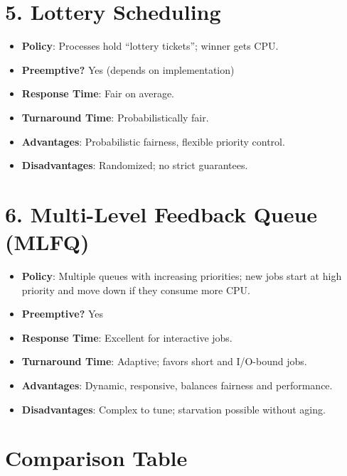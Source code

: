 \documentclass[12pt]{article}
\begin{document}
\section*{5. Lottery Scheduling}

\begin{itemize}
    \item \textbf{Policy}: Processes hold ``lottery tickets''; winner gets CPU.
    \item \textbf{Preemptive?} Yes (depends on implementation)
    \item \textbf{Response Time}: Fair on average.
    \item \textbf{Turnaround Time}: Probabilistically fair.
    \item \textbf{Advantages}: Probabilistic fairness, flexible priority control.
    \item \textbf{Disadvantages}: Randomized; no strict guarantees.
\end{itemize}

\section*{6. Multi-Level Feedback Queue (MLFQ)}

\begin{itemize}
    \item \textbf{Policy}: Multiple queues with increasing priorities; new jobs start at high priority and move down if they consume more CPU.
    \item \textbf{Preemptive?} Yes
    \item \textbf{Response Time}: Excellent for interactive jobs.
    \item \textbf{Turnaround Time}: Adaptive; favors short and I/O-bound jobs.
    \item \textbf{Advantages}: Dynamic, responsive, balances fairness and performance.
    \item \textbf{Disadvantages}: Complex to tune; starvation possible without aging.
\end{itemize}

\section*{Comparison Table}
\end{document}
